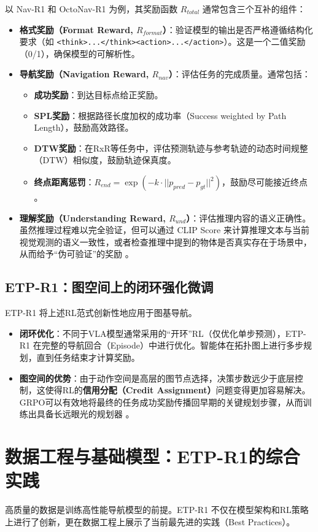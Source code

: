 以 Nav-R1   和 OctoNav-R1   为例，其奖励函数 $R_{total}$ 通常包含三个互补的组件：
\begin{itemize}
    \item \textbf{格式奖励（Format Reward, $R_{format}$）}：验证模型的输出是否严格遵循结构化要求（如 \texttt{<think>...</think><action>...</action>}）。这是一个二值奖励（0/1），确保模型的可解析性。
    \item \textbf{导航奖励（Navigation Reward, $R_{nav}$）}：评估任务的完成质量。通常包括：
    \begin{itemize}
        \item \textbf{成功奖励}：到达目标点给正奖励。
        \item \textbf{SPL奖励}：根据路径长度加权的成功率（Success weighted by Path Length），鼓励高效路径。
        \item \textbf{DTW奖励}：在RxR等任务中，评估预测轨迹与参考轨迹的动态时间规整（DTW）相似度，鼓励轨迹保真度。
        \item \textbf{终点距离惩罚}：$R_{end} = \exp(-k \cdot ||p_{pred} - p_{gt}||^2)$，鼓励尽可能接近终点  。
    \end{itemize}
    \item \textbf{理解奖励（Understanding Reward, $R_{und}$）}：评估推理内容的语义正确性。虽然推理过程难以完全验证，但可以通过 CLIP Score 来计算推理文本与当前视觉观测的语义一致性，或者检查推理中提到的物体是否真实存在于场景中，从而给予“伪可验证”的奖励  。
\end{itemize}

\subsection{ETP-R1：图空间上的闭环强化微调}
ETP-R1   将上述RL范式创新性地应用于图基导航。
\begin{itemize}
    \item \textbf{闭环优化}：不同于VLA模型通常采用的“开环”RL（仅优化单步预测），ETP-R1 在完整的导航回合（Episode）中进行优化。智能体在拓扑图上进行多步规划，直到任务结束才计算奖励。
    \item \textbf{图空间的优势}：由于动作空间是高层的图节点选择，决策步数远少于底层控制，这使得RL的\textbf{信用分配（Credit Assignment）}问题变得更加容易解决。GRPO可以有效地将最终的任务成功奖励传播回早期的关键规划步骤，从而训练出具备长远眼光的规划器  。
\end{itemize}

\section{数据工程与基础模型：ETP-R1的综合实践}
高质量的数据是训练高性能导航模型的前提。ETP-R1   不仅在模型架构和RL策略上进行了创新，更在数据工程上展示了当前最先进的实践（Best Practices）。

